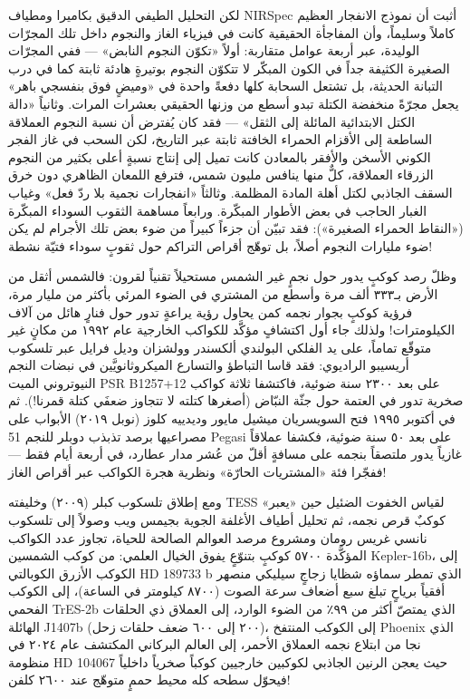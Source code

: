 \documentclass[12pt,a4paper,openany]{book}
\begin{document}
لكن التحليل الطيفي الدقيق بكاميرا ومطياف NIRSpec أثبت أن نموذج الانفجار العظيم كاملاً وسليماً، وأن المفاجأة الحقيقية كانت في فيزياء الغاز والنجوم داخل تلك المجرّات الوليدة، عبر أربعة عوامل متقاربة: أولاً «تكوّن النجوم النابض» — ففي المجرّات الصغيرة الكثيفة جداً في الكون المبكّر لا تتكوّن النجوم بوتيرةٍ هادئة ثابتة كما في درب التبانة الحديثة، بل تشتعل السحابة كلها دفعةً واحدة في «وميضٍ فوق بنفسجي باهر» يجعل مجرّةً منخفضة الكتلة تبدو أسطع من وزنها الحقيقي بعشرات المرات. وثانياً «دالة الكتل الابتدائية المائلة إلى الثقل» — فقد كان يُفترض أن نسبة النجوم العملاقة الساطعة إلى الأقزام الحمراء الخافتة ثابتة عبر التاريخ، لكن السحب في غاز الفجر الكوني الأسخن والأفقر بالمعادن كانت تميل إلى إنتاج نسبةٍ أعلى بكثير من النجوم الزرقاء العملاقة، كلٌّ منها ينافس مليون شمس، فترفع اللمعان الظاهري دون خرق السقف الجاذبي لكتل أهلة المادة المظلمة. وثالثاً «انفجارات نجمية بلا ردّ فعل» وغياب الغبار الحاجب في بعض الأطوار المبكّرة. ورابعاً مساهمة الثقوب السوداء المبكّرة («النقاط الحمراء الصغيرة»): فقد تبيّن أن جزءاً كبيراً من ضوء بعض تلك الأجرام لم يكن ضوء مليارات النجوم أصلاً، بل توهّج أقراص التراكم حول ثقوبٍ سوداء فتيّة نشطة!


وظلّ رصد كوكبٍ يدور حول نجمٍ غير الشمس مستحيلاً تقنياً لقرون: فالشمس أثقل من الأرض بـ٣٣٣ ألف مرة وأسطع من المشتري في الضوء المرئي بأكثر من مليار مرة، فرؤية كوكبٍ بجوار نجمه كمن يحاول رؤية يراعةٍ تدور حول فنارٍ هائل من آلاف الكيلومترات! ولذلك جاء أول اكتشافٍ مؤكَّد للكواكب الخارجية عام ١٩٩٢ من مكانٍ غير متوقّع تماماً، على يد الفلكي البولندي ألكسندر وولشزان وديل فرايل عبر تلسكوب أريسيبو الراديوي: فقد قاسا التباطؤ والتسارع الميكروثانويَّين في نبضات النجم النيوتروني الميت PSR B1257+12 على بعد ٢٣٠٠ سنة ضوئية، فاكتشفا ثلاثة كواكب صخرية تدور في العتمة حول جثّة النبّاض (أصغرها كتلته لا تتجاوز ضعفَي كتلة قمرنا!). ثم في أكتوبر ١٩٩٥ فتح السويسريان ميشيل مايور وديدييه كلوز (نوبل ٢٠١٩) الأبواب على مصراعيها برصد تذبذب دوبلر للنجم 51 Pegasi على بعد ٥٠ سنة ضوئية، فكشفا عملاقاً غازياً يدور ملتصقاً بنجمه على مسافةٍ أقلّ من عُشر مدار عطارد، في أربعة أيام فقط — ففجّرا فئة «المشتريات الحارّة» ونظرية هجرة الكواكب عبر أقراص الغاز!


ومع إطلاق تلسكوب كبلر (٢٠٠٩) وخليفته TESS لقياس الخفوت الضئيل حين «يعبر» كوكبٌ قرص نجمه، ثم تحليل أطياف الأغلفة الجوية بجيمس ويب وصولاً إلى تلسكوب نانسي غريس رومان ومشروع مرصد العوالم الصالحة للحياة، تجاوز عدد الكواكب المؤكَّدة ٥٧٠٠ كوكبٍ بتنوّعٍ يفوق الخيال العلمي: من كوكب الشمسين Kepler-16b، إلى الكوكب الأزرق الكوبالتي HD 189733 b الذي تمطر سماؤه شظايا زجاجٍ سيليكي منصهر أفقياً برياحٍ تبلغ سبع أضعاف سرعة الصوت (٨٧٠٠ كيلومتر في الساعة)، إلى الكوكب الفحمي TrES-2b الذي يمتصّ أكثر من ٩٩٪ من الضوء الوارد، إلى العملاق ذي الحلقات الهائلة J1407b (٢٠٠ إلى ٦٠٠ ضعف حلقات زحل)، إلى الكوكب المنتفخ Phoenix الذي نجا من ابتلاع نجمه العملاق الأحمر، إلى العالم البركاني المكتشف عام ٢٠٢٤ في منظومة HD 104067 حيث يعجن الرنين الجاذبي لكوكبين خارجيين كوكباً صخرياً داخلياً فيحوّل سطحه كله محيط حممٍ متوهّج عند ٢٦٠٠ كلفن!
\end{document}
